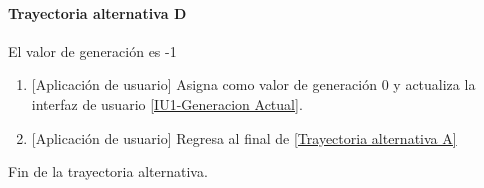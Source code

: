	
\paragraph{Trayectoria alternativa D} \label{SUB-U-CU1.2:TD}
	El valor de generación es -1
	\begin{enumerate}[label=D\arabic*.]
		\item {[Aplicación de usuario]} Asigna como valor de generación 0 y actualiza la interfaz de usuario \hyperref[fig:monitoreo]{[IU1-Generacion Actual]}.
		\item {[Aplicación de usuario]} Regresa al final de \hyperref[SUB-U-CU1.2:TA]{[Trayectoria alternativa A]}
	\end{enumerate}
	Fin de la trayectoria alternativa.


